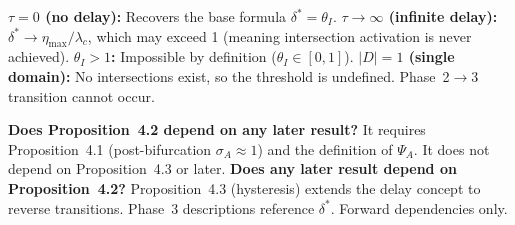 \begin{boundary-case}
\textbf{$\tau = 0$ (no delay):} Recovers the base formula $\delta^* = \theta_I$.
\textbf{$\tau \to \infty$ (infinite delay):} $\delta^* \to \eta_{\max}/\lambda_c$,
which may exceed 1 (meaning intersection activation is never achieved).
\textbf{$\theta_I > 1$:} Impossible by definition ($\theta_I \in [0,1]$).
\textbf{$|D| = 1$ (single domain):} No intersections exist, so the threshold
is undefined. Phase~2$\to$3 transition cannot occur.
\end{boundary-case}

\begin{circularity-check}
\textbf{Does Proposition~4.2 depend on any later result?} It requires
Proposition~4.1 (post-bifurcation $\sigma_A \approx 1$) and the
definition of $\Psi_A$. It does not depend on Proposition~4.3 or later.
\textbf{Does any later result depend on Proposition~4.2?}
Proposition~4.3 (hysteresis) extends the delay concept to reverse
transitions. Phase~3 descriptions reference $\delta^*$. Forward
dependencies only.
\end{circularity-check}
